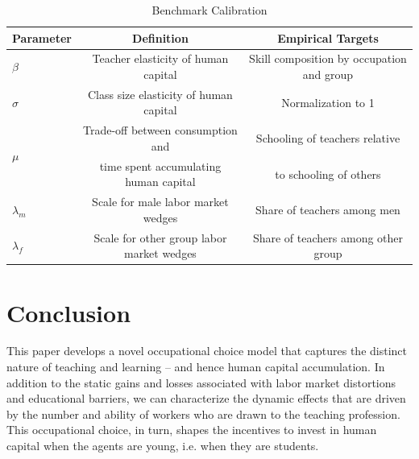 \documentclass[onehalfspacing,11pt]{article}
\begin{document}
	\begin{table}[h!]
		\centering
		\begin{tabular}{lcc}
			\toprule
			\toprule
			Parameter & Definition & Empirical Targets\\
			\midrule
			$\beta$ & Teacher elasticity of human capital & Skill composition by occupation and group \\
			$\sigma$ & Class size elasticity of human capital & Normalization to 1\\
			\multirow{2}{*}{$\mu$} &  Trade-off between consumption and & Schooling of teachers relative\\
			& time spent accumulating human capital & to schooling of others\\
			$\lambda_m$ & Scale for male labor market wedges & Share of teachers among men\\
			$\lambda_f$ & Scale for other group labor market wedges & Share of teachers among other group\\
			\bottomrule
		\end{tabular}
		\caption{Benchmark Calibration}
		\label{tab:calibr}
	\end{table}
	
	
	
	
	\newpage
	\section{Conclusion}\label{sec:conclusion}
	This paper develops a novel occupational choice model that captures the distinct nature of teaching and learning -- and hence human capital accumulation. In addition to the static gains and losses associated with labor market distortions and educational barriers, we can characterize the dynamic effects that are driven by the number and ability of workers who are drawn to the teaching profession. This occupational choice, in turn, shapes the incentives to invest in human capital when the agents are young, i.e. when they are students.
	
\end{document}
